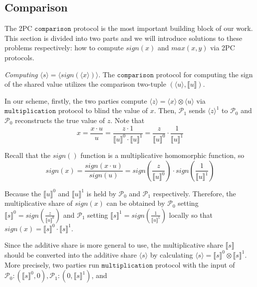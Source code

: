 \documentclass[letterpaper]{article} %
\begin{document}
    \subsection{Comparison}
    The 2PC $\mathtt{comparison}$ protocol is the most important building block of our work.
    This section is divided into two parts and we will introduce solutions to these problems respectively:
    how to compute $sign(x)$ and $max(x,y)$ via 2PC protocols.

    \emph{Computing} $\langle s\rangle  = \langle sign(\langle x\rangle)\rangle $.
    The $\mathtt{comparison}$ protocol for computing the sign of the shared value utilizes the comparison two-tuple $(\langle u\rangle,\llbracket u \rrbracket )$.

    In our scheme, firstly, the two parties compute $ \langle z\rangle = \langle x\rangle\otimes \langle u\rangle$ via $\mathtt{multiplication}$ protocol
    to blind the value of $x$.
    Then, $\mathcal{P}_{1}$ sends  $ \langle z\rangle^{1}$ to $\mathcal{P}_{0}$ and
    $\mathcal{P}_{0}$ reconstructs the true value of $z$.
    Note that
    $$x=\frac{x\cdot u}{u}
        =\frac{z\cdot 1}{\llbracket u \rrbracket^{0}\cdot \llbracket u \rrbracket^{1}}
        =\frac{z}{\llbracket u \rrbracket^{0}}\cdot\frac{1}{\llbracket u \rrbracket^{1}}$$

    Recall that the $sign()$ function is a multiplicative homomorphic function, so
    $$sign(x)=\frac{sign(x \cdot u)}{sign(u)}
    =sign(\frac{z}{\llbracket u \rrbracket^{0}})
    \cdot sign(\frac{1}{\llbracket u \rrbracket^{1}})$$



    Because the $\llbracket u \rrbracket^{0}$ and $\llbracket u \rrbracket^{1}$
    is held by $\mathcal{P}_{0}$ and $\mathcal{P}_{1}$ respectively.
    Therefore, the multiplicative share of $sign(x)$ can be obtained by
    $\mathcal{P}_{0}$ setting $\llbracket s \rrbracket^{0}
    =sign(\frac{z}{\llbracket u \rrbracket^{0}})$
    and $\mathcal{P}_{1}$ setting $\llbracket s \rrbracket^{1}
    =sign(\frac{1}{\llbracket u \rrbracket^{1}})$ locally
    so that $sign(x)=\llbracket s \rrbracket^{0}\cdot \llbracket s \rrbracket^{1}$.

    Since the additive share is more general to use,
    the multiplicative share $\llbracket s \rrbracket$ should be converted into the additive share $\langle s\rangle$
    by calculating $\langle s\rangle = \llbracket s \rrbracket ^{0}\otimes \llbracket s \rrbracket ^{1}$.
    More precisely, two parties run $\mathtt{multiplication}$ protocol with the input of
    $\mathcal{P}_{0}:(\llbracket s \rrbracket ^{0},0),\mathcal{P}_{1}:(0,\llbracket s \rrbracket ^{1})$, and
\end{document}
